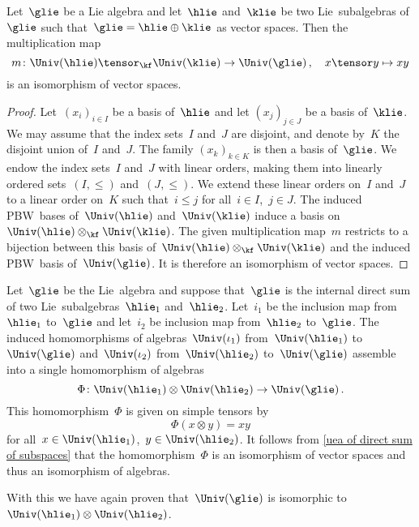 \begin{proposition}
	\label{uea of direct sum of subspaces}
	Let~$\glie$ be a Lie algebra and let~$\hlie$ and~$\klie$ be two Lie~subalgebras of~$\glie$ such that~$\glie = \hlie \oplus \klie$ as vector spaces.
	Then the multiplication map
	\[
		m
		\colon
		\Univ(\hlie) \tensor_{\kf} \Univ(\klie)
		\to
		\Univ(\glie) \,,
		\quad
		x \tensor y
		\mapsto
		xy
	\]
	is an isomorphism of vector spaces.
\end{proposition}


\begin{proof}
	Let~$(x_i)_{i \in I}$ be a basis of~$\hlie$ and let $(x_j)_{j \in J}$ be a basis of~$\klie$.
	We may assume that the index sets~$I$ and~$J$ are disjoint, and denote by~$K$ the disjoint union of~$I$ and~$J$.
	The family $(x_k)_{k \in K}$ is then a basis of~$\glie$.
	We endow the index sets~$I$ and~$J$ with linear orders, making them into linearly ordered sets~$(I, \leq)$ and~$(J, \leq)$.
	We extend these linear orders on~$I$ and~$J$ to a linear order on~$K$ such that~$i \leq j$ for all~$i \in I$,~$j \in J$.
	The induced PBW~bases of~$\Univ(\hlie)$ and~$\Univ(\klie)$ induce a basis on~$\Univ(\hlie) \otimes_{\kf} \Univ(\klie)$.
	The given multiplication map~$m$ restricts to a bijection between this basis of~$\Univ(\hlie) \otimes_{\kf} \Univ(\klie)$ and the induced PBW~basis of~$\Univ(\glie)$.
	It is therefore an isomorphism of vector spaces.
\end{proof}


\begin{remark}
	Let~$\glie$ be the Lie~algebra and suppose that~$\glie$ is the internal direct sum of two Lie~subalgebras~$\hlie_1$ and~$\hlie_2$.
	Let~$i_1$ be the inclusion map from~$\hlie_1$ to~$\glie$ and let~$i_2$ be inclusion map from~$\hlie_2$ to~$\glie$.
	The induced homomorphisms of algebras~$\Univ(\iota_1)$ from~$\Univ(\hlie_1)$ to~$\Univ(\glie)$ and~$\Univ(\iota_2)$ from~$\Univ(\hlie_2)$ to~$\Univ(\glie)$ assemble into a single homomorphism of algebras
	\[
		\Phi
		\colon
		\Univ(\hlie_1) \otimes \Univ(\hlie_2)
		\to
		\Univ(\glie) \,.
	\]
	This homomorphism~$\Phi$ is given on simple tensors by
	\[
		\Phi(x \otimes y)
		=
		x y
	\]
	for all~$x \in \Univ(\hlie_1)$,~$y \in \Univ(\hlie_2)$.
	It follows from \cref{uea of direct sum of subspaces} that the homomorphism~$\Phi$ is an isomorphism of vector spaces and thus an isomorphism of algebras.

	With this we have again proven that~$\Univ(\glie)$ is isomorphic to~$\Univ(\hlie_1) \otimes \Univ(\hlie_2)$.
\end{remark}



